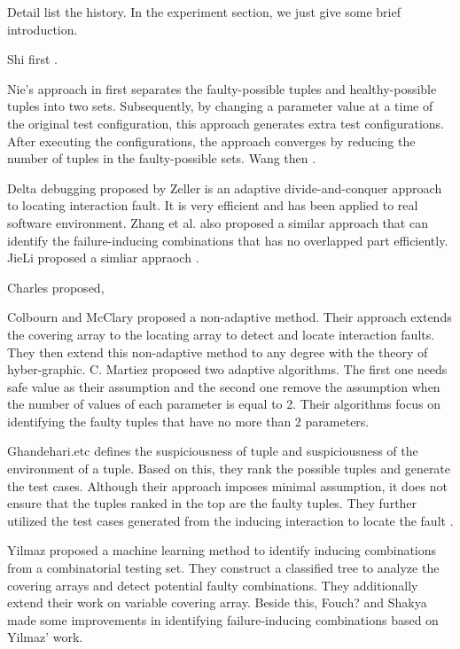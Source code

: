 \documentclass[10pt,journal,cspaper,compsoc]{IEEEtran}
\begin{document}
Detail list the history. In the experiment section, we just give some brief introduction.

Shi first \cite{shi2005software} .

Nie's approach in \cite {nie2011minimal} first separates the faulty-possible tuples and healthy-possible tuples into two sets. Subsequently, by changing a parameter value at a time of the original test configuration, this approach generates extra test configurations. After executing the configurations, the approach converges by reducing the number of tuples in the faulty-possible sets.
Wang then \cite{wang2010adaptive}.

Delta debugging \cite{zeller2002simplifying} proposed by Zeller is an adaptive divide-and-conquer approach to locating interaction fault. It is very efficient and has been applied to real software environment. Zhang et al. \cite{zhang2011characterizing} also proposed a similar approach that can identify the failure-inducing combinations that has no overlapped part efficiently.  JieLi proposed a simliar appraoch \cite{li2012improved}.

Charles \cite{colbourn2008locating} proposed,

Colbourn and McClary \cite{martinez2008algorithms} proposed a non-adaptive method. Their approach extends the covering array to the locating array to detect and locate interaction faults. They \cite{martinez2009locating} then extend this non-adaptive method to any degree with the theory of hyber-graphic.  C. Martiez \cite{martinez2008algorithms,martinez2009locating}proposed two adaptive algorithms. The first one needs safe value as their assumption and the second one remove the assumption when the number of values of each parameter is equal to 2. Their algorithms focus on identifying the faulty tuples that have no more than 2 parameters.

Ghandehari.etc \cite{ghandehari2012identifying} defines the suspiciousness of tuple and suspiciousness of the environment of a tuple. Based on this, they rank the possible tuples and generate the test cases. Although their approach imposes minimal assumption, it does not ensure that the tuples ranked in the top are the faulty tuples. They further utilized the test cases generated from the inducing interaction to locate the fault \cite{ghandehari2013fault}.

Yilmaz \cite{yilmaz2004covering} proposed a machine learning method to identify inducing combinations from a combinatorial testing set. They construct a classified tree to analyze the covering arrays and detect potential faulty combinations. They \cite{yilmaz2006covering} additionally extend their work on variable covering array. Beside this, Fouch?\cite{fouche2009incremental} and Shakya \cite{shakya2012isolating} made some improvements in identifying failure-inducing combinations based on Yilmaz' work.
\end{document}
